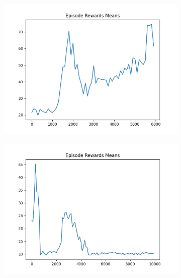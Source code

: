 \begin{figure}[H]
    \centering
    \begin{subfigure}{.47\linewidth}
        \centering
        \includegraphics[width=\textwidth]{pole/2024-06-14_18-17-10_dqn_cartpole_episode_rewards_means.png}
    \end{subfigure}
    \begin{subfigure}{.47\linewidth}
        \centering
        \includegraphics[width=\textwidth]{pole/2024-06-13_17-34-57_dqn_cartpole_episode_rewards_means.png}
    \end{subfigure}
    \begin{subfigure}{.47\linewidth}
        \centering

\end{subfigure}
\end{figure}
